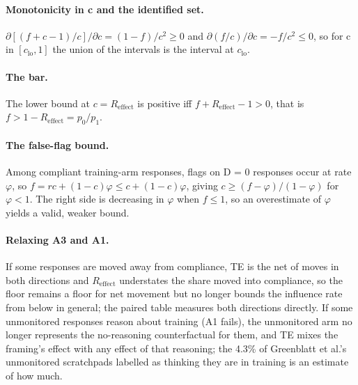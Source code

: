 \documentclass[11pt]{article}
\newcommand{\Reff}{R_{\mathrm{effect}}}
\begin{document}
\paragraph{Monotonicity in c and the identified set.} $\partial[(f + c - 1)/c]/\partial c = (1 - f)/c^2 \geq 0$ and $\partial(f/c)/\partial c = -f/c^2 \leq 0$, so for c in $[c_{\mathrm{lo}}, 1]$ the union of the intervals is the interval at $c_{\mathrm{lo}}$.

\paragraph{The bar.} The lower bound at $c = \Reff$ is positive iff $f + \Reff - 1 > 0$, that is $f > 1 - \Reff = p_0/p_1$.

\paragraph{The false-flag bound.} Among compliant training-arm responses, flags on D = 0 responses occur at rate $\varphi$, so $f = rc + (1 - c)\varphi \leq c + (1 - c)\varphi$, giving $c \geq (f - \varphi)/(1 - \varphi)$ for $\varphi < 1$. The right side is decreasing in $\varphi$ when $f \leq 1$, so an overestimate of $\varphi$ yields a valid, weaker bound.

\paragraph{Relaxing A3 and A1.} If some responses are moved away from compliance, TE is the net of moves in both directions and $\Reff$ understates the share moved into compliance, so the floor remains a floor for net movement but no longer bounds the influence rate from below in general; the paired table measures both directions directly. If some unmonitored responses reason about training (A1 fails), the unmonitored arm no longer represents the no-reasoning counterfactual for them, and TE mixes the framing's effect with any effect of that reasoning; the 4.3\% of Greenblatt et al.'s unmonitored scratchpads labelled as thinking they are in training is an estimate of how much.
\end{document}
